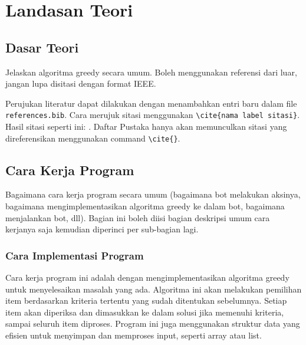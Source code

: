 \newpage

\chapter{Landasan Teori} \label{Bab II}

\section{Dasar Teori} \label{II.Dasar Teori}
Jelaskan algoritma greedy secara umum. Boleh menggunakan referensi dari luar, jangan lupa disitasi dengan format IEEE. \par

Perujukan literatur dapat dilakukan dengan menambahkan entri baru dalam file \verb|references.bib|. Cara merujuk sitasi menggunakan \verb|\cite{nama label sitasi}|. Hasil sitasi seperti ini: \cite{knuth2001art}. Daftar Pustaka hanya akan memunculkan sitasi yang direferensikan menggunakan command \verb|\cite{}|. \par

\section{Cara Kerja Program} \label{II.Cara_Kerja}
Bagaimana cara kerja program secara umum (bagaimana bot melakukan aksinya, bagaimana mengimplementasikan algoritma greedy ke dalam bot, bagaimana menjalankan bot, dll). Bagian ini boleh diisi bagian deskripsi umum cara kerjanya saja kemudian diperinci per sub-bagian lagi.

\subsection{Cara Implementasi Program}
Cara kerja program ini adalah dengan mengimplementasikan algoritma greedy untuk menyelesaikan masalah yang ada. Algoritma ini akan melakukan pemilihan item berdasarkan kriteria tertentu yang sudah ditentukan sebelumnya. Setiap item akan diperiksa dan dimasukkan ke dalam solusi jika memenuhi kriteria, sampai seluruh item diproses. Program ini juga menggunakan struktur data yang efisien untuk menyimpan dan memproses input, seperti array atau list.

\bigskip

